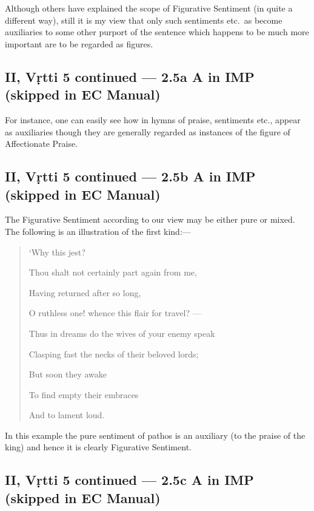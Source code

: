 \documentclass[12pt]{book}
\begin{document}
Although others have explained the scope of Figurative
Sentiment (in quite a different way), still it is my view that only
such sentiments etc.\ as become auxiliaries to some other purport
of the sentence which happens to be much more important are to
be regarded as figures. 


\subsection{II, Vṛtti 5 continued --- 2.5a A in IMP (skipped in EC Manual)}

For instance, one can easily see how in
hymns of praise, sentiments etc., appear as auxiliaries though they
are generally regarded as instances of the figure of Affectionate
Praise.


\subsection{II, Vṛtti 5 continued --- 2.5b A in IMP (skipped in EC Manual)}

The Figurative Sentiment according to our view may be either
pure or mixed. The following is an illustration of the first kind:---

\begin{quotation}
\begin{em}
`Why this jest?

Thou shalt not certainly part again from me,

Having returned after so long,

O ruthless one! whence this flair for travel? ---

Thus in dreams do the wives of your enemy speak

Clasping fast the necks of their beloved lords;

But soon they awake

To find empty their embraces

And to lament loud.
\end{em}
\end{quotation}


In this example the pure sentiment of pathos is an auxiliary
(to the praise of the king) and hence it is clearly Figurative
Sentiment.


\subsection{II, Vṛtti 5 continued --- 2.5c A in IMP (skipped in EC Manual)}
\end{document}
